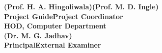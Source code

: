 \begin{spacing}{0}
\vspace{3.0cm}
\large{\textbf{(Prof. H. A. Hingoliwala)}}\hspace*{2.2in}\large{\textbf{(Prof. M. D. Ingle)}}\\
\hspace*{0.7in}\textbf{Project Guide}\hspace*{2.6in}\textbf{Project Coordinator}\\
\hspace*{0.1cm}\textbf{HOD, Computer Department}\\[3cm]
\hspace*{0.5in}\large{\textbf{(Dr. M. G. Jadhav)}}\\
\hspace*{0.9in}\textbf{Principal}\hspace*{2.8in}\textbf{External Examiner}
\end{spacing}
